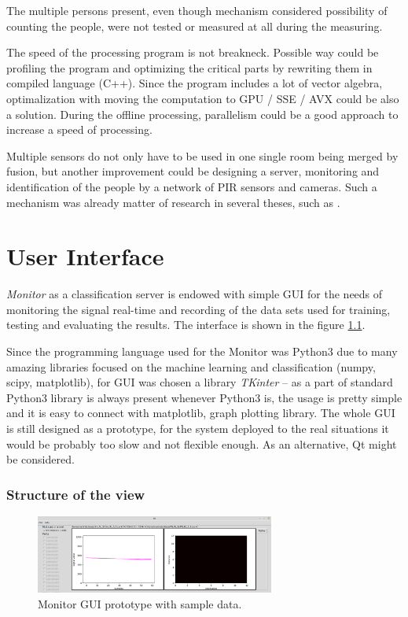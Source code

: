 The multiple persons present, even though mechanism considered possibility of counting the people,
were not tested or measured at all during the measuring.

The speed of the processing program is not breakneck. Possible way could be profiling the program and optimizing
the critical parts by rewriting them in compiled language (C++). Since the program includes a lot of vector
algebra, optimalization with moving the computation to GPU / SSE / AVX could be also a solution.
During the offline processing, parallelism could be a good approach to increase a speed of processing.

Multiple sensors do not only have to be used in one single room being merged by fusion, but
another improvement could be designing a server, monitoring and identification of the people by
a network of PIR sensors and cameras. Such a mechanism was already matter of research in
several theses, such as \cite{KenyaThesis}.




\chapter{User Interface}
\label{Label:UI}

{\it Monitor} as a classification server is endowed with simple GUI for the needs of monitoring
the signal real-time and recording of the data sets used for training, testing and evaluating the results.
The interface is shown in the figure \ref{fig:monitorGUI}.

Since the programming language used for the Monitor was Python3 due to many amazing libraries focused on the
machine learning and classification (numpy, scipy, matplotlib), for GUI was chosen a library {\it TKinter}
-- as a part of standard Python3 library is always present whenever Python3 is, the usage is pretty simple
and it is easy to connect with matplotlib, graph plotting library. The whole GUI is still designed as a prototype,
for the system deployed to the real situations it would be probably too slow and not flexible enough.
As an alternative, Qt might be considered.

\subsection*{Structure of the view}

\begin{figure}[!ht]
\begin{center}
\includegraphics[width=0.7\textwidth]{render/gui.png}
\caption{Monitor GUI prototype with sample data. \label{fig:monitorGUI}}
\end{center}
\end{figure}

